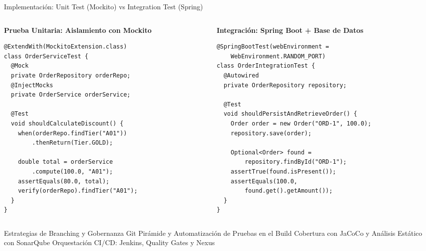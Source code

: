 \documentclass[aspectratio=169]{beamer}
\begin{document}
\begin{frame}[fragile]{Implementación: Unit Test (Mockito) vs Integration Test (Spring)}
  \begin{columns}[T,onlytextwidth]
    \begin{column}{0.49\textwidth}
      \textbf{\scriptsize\color{cbBlue} Prueba Unitaria: Aislamiento con Mockito}
      \begin{lstlisting}[style=javalst,basicstyle=\ttfamily\fontsize{6.0pt}{7.2pt}\selectfont]
@ExtendWith(MockitoExtension.class)
class OrderServiceTest {
  @Mock
  private OrderRepository orderRepo;
  @InjectMocks
  private OrderService orderService;

  @Test
  void shouldCalculateDiscount() {
    when(orderRepo.findTier("A01"))
        .thenReturn(Tier.GOLD);
    
    double total = orderService
        .compute(100.0, "A01");
    assertEquals(80.0, total);
    verify(orderRepo).findTier("A01");
  }
}
      \end{lstlisting}
    \end{column}
    \begin{column}{0.49\textwidth}
      \textbf{\scriptsize\color{cbPurple} Integración: Spring Boot + Base de Datos}
      \begin{lstlisting}[style=javalst,basicstyle=\ttfamily\fontsize{6.0pt}{7.2pt}\selectfont]
@SpringBootTest(webEnvironment = 
    WebEnvironment.RANDOM_PORT)
class OrderIntegrationTest {
  @Autowired
  private OrderRepository repository;

  @Test
  void shouldPersistAndRetrieveOrder() {
    Order order = new Order("ORD-1", 100.0);
    repository.save(order);

    Optional<Order> found = 
        repository.findById("ORD-1");
    assertTrue(found.isPresent());
    assertEquals(100.0, 
        found.get().getAmount());
  }
}
      \end{lstlisting}
    \end{column}
  \end{columns}
\end{frame}

  {Estrategias de Branching y Gobernanza Git}
  {Pirámide y Automatización de Pruebas en el Build}
  {Cobertura con JaCoCo y Análisis Estático con SonarQube}
  {Orquestación CI/CD: Jenkins, Quality Gates y Nexus}
\end{document}
